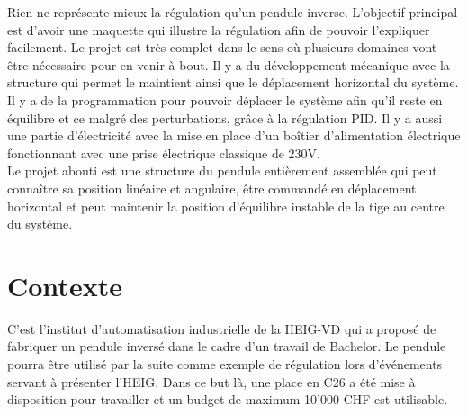 Rien ne représente mieux la régulation qu'un pendule inverse. L'objectif principal est d'avoir une maquette qui illustre la régulation
afin de pouvoir l'expliquer facilement. Le projet est très complet dans le sens où plusieurs domaines vont être nécessaire pour en venir
à bout. Il y a du développement mécanique avec la structure qui permet le maintient ainsi que le déplacement horizontal du système.
Il y a de la programmation pour pouvoir déplacer le système afin qu'il reste en équilibre et ce malgré des perturbations, grâce à la
régulation PID. Il y a aussi une partie d'électricité avec la mise en place d'un boîtier d'alimentation électrique fonctionnant avec une
prise électrique classique de 230V.\\

Le projet abouti est une structure du pendule entièrement assemblée qui peut connaître sa position linéaire et angulaire, être commandé
en déplacement horizontal et peut maintenir la position d'équilibre instable de la tige au centre du système.

\section{Contexte}
C'est l'institut d'automatisation industrielle de la HEIG-VD qui a proposé de fabriquer un pendule inversé dans le cadre d'un travail
de Bachelor. Le pendule pourra être utilisé par la suite comme exemple de régulation lors d'événements servant à présenter l'HEIG.
Dans ce but là, une place en C26 a été mise à disposition pour travailler et un budget de maximum 10'000 CHF est utilisable.